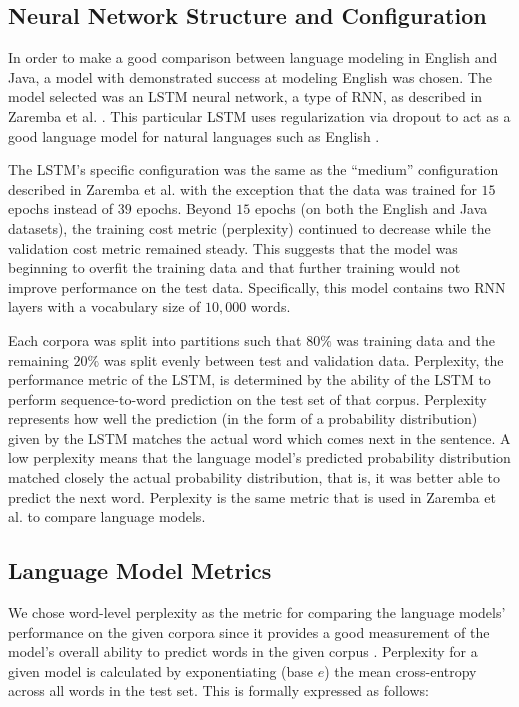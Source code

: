 \documentclass[runningheads,a4paper]{llncs}
\begin{document}
\subsection{Neural Network Structure and Configuration}

In order to make a good comparison between language modeling in English
and Java, a model with demonstrated success at modeling English was
chosen. The model selected was an LSTM neural
network, a type of RNN, as described in
Zaremba et al. \cite{Zaremba}. This particular LSTM uses regularization via 
dropout to act as a good language model for natural languages
such as English \cite{Zaremba}.

The LSTM's specific configuration was the same as the ``medium''
configuration described in Zaremba et al. \cite{Zaremba} with the exception
that the data was trained for $15$ epochs instead of $39$ epochs.
Beyond $15$ epochs (on both the English and Java datasets), the 
training cost metric (perplexity) continued to decrease while the
validation cost metric remained steady. This suggests that the model
was beginning to overfit the training data and that further training
would not improve performance on the test data.
Specifically, this model contains two RNN layers with a vocabulary
size of $10,000$ words.

Each corpora was split into partitions such that $80\%$ was training data
and the remaining $20\%$ was split evenly between test and validation
data. Perplexity, the performance metric of the LSTM, is determined by the
ability of the LSTM to perform sequence-to-word prediction on the test
set of that corpus. Perplexity represents how well the prediction (in the
form of a probability distribution) given by the LSTM matches the actual
word which comes next in the sentence. A low perplexity means that the
language model's predicted probability distribution matched closely the
actual probability distribution, that is, it was better able to predict
the next word. Perplexity is the same metric that is used in
Zaremba et al. \cite{Zaremba} to compare language models.

\subsection{Language Model Metrics}

We chose word-level perplexity as the metric for comparing the
language models' performance on the given corpora since it provides
a good measurement of the model's overall ability to predict words
in the given corpus \cite{sundermeyer2015feedforward}. 
Perplexity for a given model is calculated
by exponentiating (base $e$) the mean
cross-entropy across all words in the test set. This is formally
expressed as follows:
\end{document}
